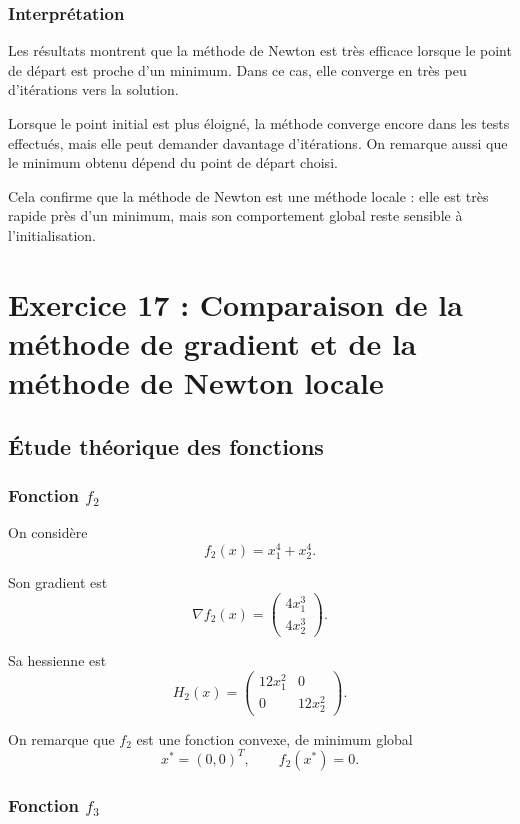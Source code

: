 \documentclass[a4paper,12pt]{article}
\begin{document}
	\subsubsection{Interprétation}
	
	Les résultats montrent que la méthode de Newton est très efficace lorsque le point de départ est proche d’un minimum. Dans ce cas, elle converge en très peu d’itérations vers la solution.
	
	Lorsque le point initial est plus éloigné, la méthode converge encore dans les tests effectués, mais elle peut demander davantage d’itérations. On remarque aussi que le minimum obtenu dépend du point de départ choisi.
	
	Cela confirme que la méthode de Newton est une méthode locale : elle est très rapide près d’un minimum, mais son comportement global reste sensible à l’initialisation.
	
	\section{Exercice 17 : Comparaison de la méthode de gradient et de la méthode de Newton locale}
	
	\subsection{Étude théorique des fonctions}
	
	\subsubsection{Fonction \(f_2\)}
	
	On considère
	\[
	f_2(x)=x_1^4+x_2^4.
	\]
	
	Son gradient est
	\[
	\nabla f_2(x)=
	\begin{pmatrix}
	4x_1^3\\
	4x_2^3
	\end{pmatrix}.
	\]
	
	Sa hessienne est
	\[
	H_2(x)=
	\begin{pmatrix}
	12x_1^2 & 0\\
	0 & 12x_2^2
	\end{pmatrix}.
	\]
	
	On remarque que \(f_2\) est une fonction convexe, de minimum global
	\[
	x^*=(0,0)^T,
	\qquad
	f_2(x^*)=0.
	\]
	
	\subsubsection{Fonction \(f_3\)}
	
\end{document}
